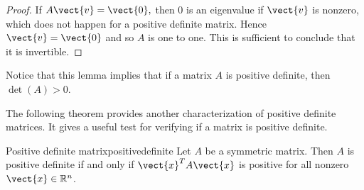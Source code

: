 \begin{proof}
If $A\vect{v}=\vect{0},$ then $0$ is an eigenvalue if $\vect{v}$ is nonzero, which
does not happen for a positive definite matrix. Hence $\vect{v}=\vect{0}$ and
so $A$ is one to one. This is sufficient to conclude that it is invertible.
\end{proof}

Notice that this lemma implies that if a matrix $A$ is positive definite, then $\det(A) > 0$. 

The following theorem provides another characterization of positive definite matrices. It gives a useful test for verifying if a matrix is positive definite. 

\begin{theorem}{Positive definite matrix}{positivedefinite}
Let $A$ be a symmetric matrix. Then $A$ is positive definite if and
only if $\vect{x}^T A \vect{x} $ is positive for all nonzero $\vect{x}
\in \mathbb{R}^n$.
\end{theorem}

